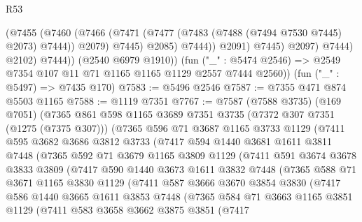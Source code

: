 \begin{lexlean}{R53}
\begin{coremodule}
                        (@7455
                          (@7460
                            (@7466
                              (@7471 (@7477 (@7483 (@7488 (@7494 @7530 @7445) @2073) @7444)) @2079)
                              @7445)
                            @2085)
                          @7444))
                      @2091)
                    @7445)
                  @2097)
                @7444)
              @2102)
            @7444))
        (@2540 @6979 @1910))
      (fun ("_" : @5474 @2546) => @2549 @7354 @107 @11 @71 @1165 @1165 @1129 @2557 @7444 @2560))
    (fun ("_" : @5497) => @7435 @170)
@7583 := @5496 @2546
@7587 := @7355 @471 @874 @5503 @1165
@7588 := @1119 @7351
@7767 := @7587
    (@7588 @3735)
    (@169 @7051)
    (@7365
      @861
      @598
      @1165
      @3689
      @7351
      @3735
      (@7372 @307 @7351 (@1275 (@7375 @307)))
      (@7365
        @596
        @71
        @3687
        @1165
        @3733
        @1129
        (@7411
          @595
          @3682
          @3686
          @3812
          @3733
          (@7417
            @594
            @1440
            @3681
            @1611
            @3811
            @7448
            (@7365
              @592
              @71
              @3679
              @1165
              @3809
              @1129
              (@7411
                @591
                @3674
                @3678
                @3833
                @3809
                (@7417
                  @590
                  @1440
                  @3673
                  @1611
                  @3832
                  @7448
                  (@7365
                    @588
                    @71
                    @3671
                    @1165
                    @3830
                    @1129
                    (@7411
                      @587
                      @3666
                      @3670
                      @3854
                      @3830
                      (@7417
                        @586
                        @1440
                        @3665
                        @1611
                        @3853
                        @7448
                        (@7365
                          @584
                          @71
                          @3663
                          @1165
                          @3851
                          @1129
                          (@7411
                            @583
                            @3658
                            @3662
                            @3875
                            @3851
                            (@7417

\end{coremodule}
\end{lexlean}
